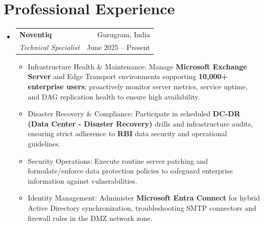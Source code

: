 \documentclass[11pt, a4paper]{article}
\makeatletter
\newcommand{\resumeItem}[1]{
  \item\small{#1}
}
\newcommand{\resumeSubheading}[4]{
  \vspace{-2pt}\item[]
    \begin{tabular*}{1\textwidth}[t]{l@{\extracolsep{\fill}}r}
      \textbf{#1} & \textcolor{muted}{\small #2} \\
      \textit{#3} & \textcolor{muted}{\small #4} \\
    \end{tabular*}\vspace{-6pt}
}
\makeatother
\begin{document}
\section{Professional Experience}
\vspace{2pt}
\begin{itemize}[leftmargin=0in, label={}]

  \resumeSubheading
      {Noventiq}{Gurugram, India}
      {Technical Specialist}{June 2025 -- Present}
      \begin{itemize}[leftmargin=0.15in, itemsep=1pt, parsep=0pt]
        \resumeItem{Infrastructure Health \& Maintenance: Manage \textbf{Microsoft Exchange Server} and Edge Transport environments supporting \textbf{10,000+ enterprise users}; proactively monitor server metrics, service uptime, and DAG replication health to ensure high availability.}
        \resumeItem{Disaster Recovery \& Compliance: Participate in scheduled \textbf{DC-DR (Data Center - Disaster Recovery)} drills and infrastructure audits, ensuring strict adherence to \textbf{RBI} data security and operational guidelines.}
        \resumeItem{Security Operations: Execute routine server patching and formulate/enforce data protection policies to safeguard enterprise information against vulnerabilities.}
        \resumeItem{Identity Management: Administer \textbf{Microsoft Entra Connect} for hybrid Active Directory synchronization, troubleshooting SMTP connectors and firewall rules in the DMZ network zone.}
      \end{itemize}

\end{itemize}
\vspace{-4pt}

\end{document}
